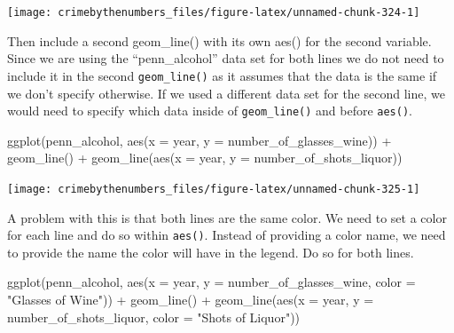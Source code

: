 \documentclass[
]{krantz}
\makeatletter
\newenvironment{Shaded}{\begin{snugshade}}{\end{snugshade}}
\newcommand{\AttributeTok}[1]{\textcolor[rgb]{0.61,0.61,0.61}{#1}}
\newcommand{\FunctionTok}[1]{\textcolor[rgb]{0,0,0}{#1}}
\newcommand{\NormalTok}[1]{#1}
\newcommand{\SpecialCharTok}[1]{\textcolor[rgb]{0,0,0}{#1}}
\newcommand{\StringTok}[1]{\textcolor[rgb]{0.5,0.5,0.5}{#1}}
\newenvironment{kframe}{%
\medskip{}
\setlength{\fboxsep}{.8em}
 \def\at@end@of@kframe{}%
 \ifinner\ifhmode%
  \def\at@end@of@kframe{\end{minipage}}%
  \begin{minipage}{\columnwidth}%
 \fi\fi%
 \def\FrameCommand##1{\hskip\@totalleftmargin \hskip-\fboxsep
 \colorbox{shadecolor}{##1}\hskip-\fboxsep
     \hskip-\linewidth \hskip-\@totalleftmargin \hskip\columnwidth}%
 \MakeFramed {\advance\hsize-\width
   \@totalleftmargin\z@ \linewidth\hsize
   \@setminipage}}%
 {\par\unskip\endMakeFramed%
 \at@end@of@kframe}
\renewenvironment{Shaded}{\begin{kframe}}{\end{kframe}}
\makeatother
\begin{document}
\begin{center}\texttt{[image: crimebythenumbers\_files/figure-latex/unnamed-chunk-324-1]} \end{center}

Then include a second geom\_line() with its own aes() for the second variable. Since we are using the ``penn\_alcohol'' data set for both lines we do not need to include it in the second \texttt{geom\_line()} as it assumes that the data is the same if we don't specify otherwise. If we used a different data set for the second line, we would need to specify which data inside of \texttt{geom\_line()} and before \texttt{aes()}.

\begin{Shaded}
\begin{Highlighting}[]
\FunctionTok{ggplot}\NormalTok{(penn\_alcohol, }\FunctionTok{aes}\NormalTok{(}\AttributeTok{x =}\NormalTok{ year, }\AttributeTok{y =}\NormalTok{ number\_of\_glasses\_wine)) }\SpecialCharTok{+}
  \FunctionTok{geom\_line}\NormalTok{() }\SpecialCharTok{+}
  \FunctionTok{geom\_line}\NormalTok{(}\FunctionTok{aes}\NormalTok{(}\AttributeTok{x =}\NormalTok{ year, }\AttributeTok{y =}\NormalTok{ number\_of\_shots\_liquor))}
\end{Highlighting}
\end{Shaded}

\begin{center}\texttt{[image: crimebythenumbers\_files/figure-latex/unnamed-chunk-325-1]} \end{center}

A problem with this is that both lines are the same color. We need to set a color for each line and do so within \texttt{aes()}. Instead of providing a color name, we need to provide the name the color will have in the legend. Do so for both lines.

\begin{Shaded}
\begin{Highlighting}[]
\FunctionTok{ggplot}\NormalTok{(penn\_alcohol, }\FunctionTok{aes}\NormalTok{(}\AttributeTok{x =}\NormalTok{ year, }\AttributeTok{y =}\NormalTok{ number\_of\_glasses\_wine,}
                         \AttributeTok{color =} \StringTok{"Glasses of Wine"}\NormalTok{)) }\SpecialCharTok{+}
  \FunctionTok{geom\_line}\NormalTok{() }\SpecialCharTok{+}
  \FunctionTok{geom\_line}\NormalTok{(}\FunctionTok{aes}\NormalTok{(}\AttributeTok{x =}\NormalTok{ year, }\AttributeTok{y =}\NormalTok{ number\_of\_shots\_liquor,}
                \AttributeTok{color =} \StringTok{"Shots of Liquor"}\NormalTok{))}
\end{Highlighting}
\end{Shaded}
\end{document}
